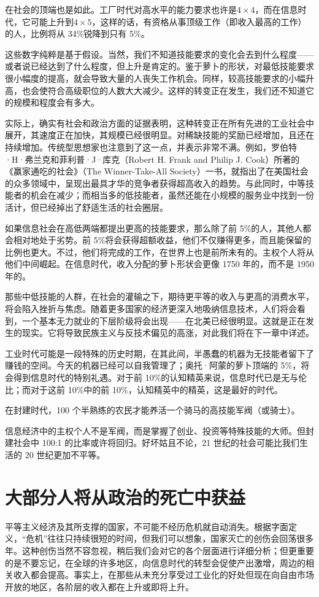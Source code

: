 在社会的顶端也是如此。工厂时代对高水平的能力要求也许是$ 4 \times 4 $，而在信息时代，它可能上升到$ 4 \times 5 $，这样的话，有资格从事顶级工作（即收入最高的工作）的人，比例将从 34\%锐降到只有 5\%。

这些数字纯粹是基于假设。当然，我们不知道技能要求的变化会去到什么程度——或者说已经达到了什么程度，但上升是肯定的。鉴于萝卜的形状，对最低技能要求很小幅度的提高，就会导致大量的人丧失工作机会。同样，较高技能要求的小幅升高，也会使符合高级职位的人数大大减少。这样的转变正在发生，我们还不知道它的规模和程度会有多大。

实际上，确实有社会和政治方面的证据表明，这种转变正在所有先进的工业社会中展开，其速度正在加快，其规模已经很明显。对稀缺技能的奖励已经增加，且还在持续增加。传统型思想家也注意到了这一点，并表示非常不满。例如，罗伯特·H·弗兰克和菲利普·J·库克（Robert H. Frank and Philip J. Cook）所著的《赢家通吃的社会》（The Winner-Take-All Society）一书，就指出了在美国社会的众多领域中，呈现出最具才华的竞争者获得超高收入的趋势。与此同时，中等技能者的机会在减少；而相当多的低技能者，虽然还能在小规模的服务业中找到一份活计，但已经掉出了舒适生活的社会圈层。

如果信息社会在高低两端都提出更高的技能要求，那么除了前 5\%的人，其他人都会相对地处于劣势。前 5\%将会获得超额收益，他们不仅赚得更多，而且能保留的比例也更大。不过，他们将完成的工作，在世界上也是前所未有的。主权个人将从他们中间崛起。在信息时代，收入分配的萝卜形状会更像 1750 年的，而不是 1950 年的。

那些中低技能的人群，在社会的灌输之下，期待更平等的收入与更高的消费水平，将会陷入挫折与焦虑。随着更多国家的经济更深入地吸纳信息技术，人们将会看到，一个基本无力就业的下层阶级将会出现——在北美已经很明显。这就是正在发生的现实。它将导致民族主义与反技术偏见的高涨，对此我们将在下一章中详述。

工业时代可能是一段特殊的历史时期，在其此间，半愚蠢的机器为无技能者留下了赚钱的空间。今天的机器已经可以自我管理了；奥托·阿蒙的萝卜顶端的 5\%，将会得到信息时代的特别礼遇。对于前 10\%的认知精英来说，信息时代已是无与伦比；而对于这前 10\%中的前 10\%，认知精英中的精英，这是最好的时代。

在封建时代，100 个半熟练的农民才能养活一个骑马的高技能军阀（或骑士）。

信息经济中的主权个人不是军阀，而是掌握了创业、投资等特殊技能的大师。但封建社会中 100:1 的比率或许将回归。好坏姑且不论，21 世纪的社会可能比我们生活的 20 世纪更加不平等。

\section{大部分人将从政治的死亡中获益}
平等主义经济及其所支撑的国家，不可能不经历危机就自动消失。根据字面定义，“危机”往往只持续很短的时间，但我们可以想象，国家灭亡的创伤会回荡很多年。这种创伤当然不容忽视，稍后我们会对它的各个层面进行详细分析；但更重要的是不要忘记，在全球的许多地区，向信息时代的转型会促使产出激增，周边的相关收入都会提高。事实上，在那些从未充分享受过工业化的好处但现在向自由市场开放的地区，各阶层的收入都在上升或即将上升。

